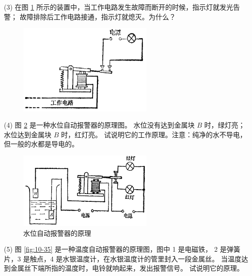 (3) 在图 \ref{fig:10-33} 所示的装置中，当工作电路发生故障而断开的时候，指示灯就发光告警；
故障排除后工作电路接通，指示灯就熄灭。为什么？

\begin{figure}[H]%
    \centering
    \includegraphics[width=0.6\textwidth]{../pic/czwl2-ch10-33}
    \caption{}\label{fig:10-33}
\end{figure}

(4) 图 \ref{fig:10-34} 是一种水位自动报警器的原理图。
水位没有达到金属块 $B$ 时，绿灯亮；水位达到金属块 $B$ 时，红灯亮。
试说明它的工作原理。注意：纯净的水不导电，但一般的水都是导电的。

\begin{figure}[htbp]
    \centering
    \includegraphics[width=0.6\textwidth]{../pic/czwl2-ch10-34}
    \caption{水位自动报警器的原理}\label{fig:10-34}
\end{figure}

(5) 图 \ref{fig:10-35} 是一种温度自动报警器的原理图，图中 1 是电磁铁，
2 是弹簧片，3 是触点，4 是水银温度计，在水银温度计的管里封入一段金属丝。
当温度达到金属丝下端所指的温度时，电铃就响起来，发出报警信号。 试说明它的原理。

